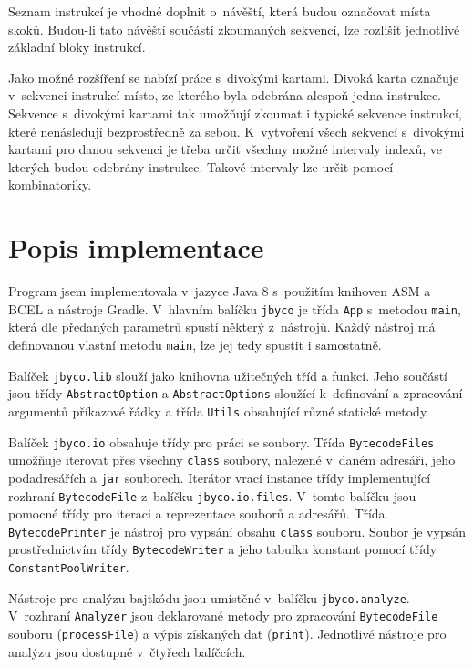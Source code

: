 Seznam instrukcí je vhodné doplnit o~návěští, která budou označovat místa skoků. Budou-li tato návěští součástí zkoumaných sekvencí, lze rozlišit jednotlivé základní bloky instrukcí.

Jako možné rozšíření se nabízí práce s~divokými kartami.
Divoká karta označuje v~sekvenci instrukcí místo, ze kterého byla odebrána alespoň jedna instrukce. Sekvence s~divokými kartami tak umožňují zkoumat i typické sekvence instrukcí, které nenásledují bezprostředně za sebou. K~vytvoření všech sekvencí s~divokými kartami pro danou sekvenci je třeba určit všechny možné intervaly indexů, ve kterých budou odebrány instrukce. Takové intervaly lze určit pomocí kombinatoriky.

\section{Popis implementace}\label{ToolImplementation}

Program jsem implementovala v~jazyce Java 8 s~použitím knihoven ASM a BCEL a nástroje Gradle. V~hlavním balíčku \texttt{jbyco} je třída \texttt{App} s~metodou \texttt{main}, která dle předaných parametrů spustí některý z~nástrojů. Každý nástroj má definovanou vlastní metodu \texttt{main}, lze jej tedy spustit i samostatně.

Balíček \texttt{jbyco.lib} slouží jako knihovna užitečných tříd a funkcí. Jeho součástí jsou třídy \texttt{AbstractOption} a \texttt{AbstractOptions} sloužící k~definování a zpracování argumentů příkazové řádky a třída \texttt{Utils} obsahující různé statické metody. 

Balíček \texttt{jbyco.io} obsahuje třídy pro práci se soubory. Třída \texttt{BytecodeFiles} umožňuje iterovat přes všechny \texttt{class} soubory, nalezené v~daném adresáři, jeho podadresářích a \texttt{jar} souborech. Iterátor vrací instance třídy implementující rozhraní \texttt{BytecodeFile} z~balíčku \texttt{jbyco.io.files}. V~tomto balíčku jsou pomocné třídy pro iteraci a reprezentace souborů a adresářů. Třída \texttt{BytecodePrinter} je nástroj pro vypsání obsahu \texttt{class} souboru. Soubor je vypsán prostřednictvím třídy \texttt{BytecodeWriter} a jeho tabulka konstant pomocí třídy \texttt{ConstantPoolWriter}.  

Nástroje pro analýzu bajtkódu jsou umístěné v~balíčku \texttt{jbyco.analyze}. V~rozhraní \texttt{Analyzer} jsou deklarované metody pro zpracování \texttt{BytecodeFile} souboru (\texttt{processFile}) a výpis získaných dat (\texttt{print}). Jednotlivé nástroje pro analýzu jsou dostupné v~čtyřech balíčcích.

